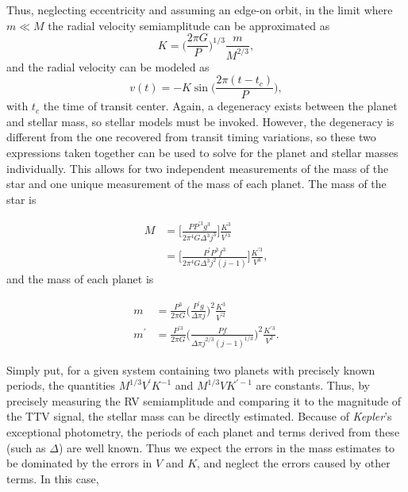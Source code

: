 Thus, neglecting eccentricity and assuming an edge-on orbit, in the limit where $m \ll M$ the radial velocity semiamplitude can be approximated as
\begin{equation}
K = \bigg (\frac{2\pi G}{P} \bigg) ^{1/3} \frac{m}{M ^{2/3}},
\label{Keqn}
\end{equation}
and the radial velocity can be modeled as
\begin{equation}
v(t) = -K \sin\bigg(\frac{2\pi(t - t_c)}{P}\bigg),
\label{RVeqn}
\end{equation}
with $t_c$ the time of transit center. Again, a degeneracy exists between the planet and stellar mass, so stellar models must be invoked. However, the degeneracy is different from the one recovered from transit timing variations, so these two expressions taken together can be used to solve for the planet and stellar masses individually. This allows for two independent measurements of the mass of the star and one unique measurement of the mass of each planet. The mass of the star is

\begin{align} 
M &= \bigg[ \frac{P P^{\prime 3} g^3}{2 \pi^4 G \Delta^3 j^3} \bigg] \frac{K^3}{V^{\prime 3}} \\
  &= \bigg[ \frac{P^\prime P^3 f^3}{2 \pi^4 G \Delta^3 j^2 (j-1)} \bigg] \frac{K^{\prime 3}}{V^3},
\end{align}
and the mass of each planet is

\begin{align}
m &= \frac{P^3}{2 \pi G} \bigg(\frac{P^\prime g}{\Delta \pi j}\bigg)^2 \frac{K^3}{V^{\prime 2}} \\
m^\prime &= \frac{P^{\prime 3}}{2 \pi G} \bigg(\frac{P f}{\Delta \pi j^{2/3} (j-1)^{1/3}}\bigg)^2 \frac{K^{\prime 3}}{V^2}.
\end{align}

Simply put, for a given system containing two planets with precisely known periods, the quantities $M^{1/3}V^{\prime}K^{-1}$ and $M^{1/3}V K^{\prime -1}$ are constants. Thus, by precisely measuring the RV semiamplitude and comparing it to the magnitude of the TTV signal, the stellar mass can be directly estimated. Because of \textit{Kepler}'s exceptional photometry, the periods of each planet and terms derived from these (such as $\Delta$) are well known. Thus we expect the errors in the mass estimates to be dominated by the errors in $V$ and $K$, and neglect the errors caused by other terms. In this case,


